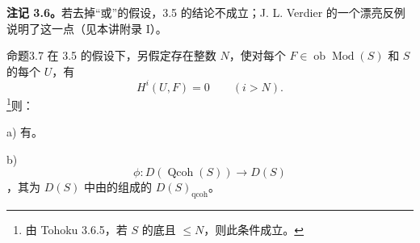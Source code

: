 \textbf{注记 3.6。}若去掉“或”的假设，3.5 的结论不成立；J. L. Verdier 的一个漂亮反例说明了这一点（见本讲附录 I）。
\begin{SGAresult}{命题}{3.7}
在 3.5 的假设下，另假定存在整数 $N$，使对每个 $F\in\operatorname{ob}\operatorname{Mod}(S)$ 和 $S$ 的每个 $U$，有
\[
H^i(U,F)=0\qquad(i>N).
\]
\footnote{由 Tohoku 3.6.5，若 $S$ 的底且  $\leq N$，则此条件成立。}则：

a) 有。

b) 
\[
\phi:D(\operatorname{Qcoh}(S))\longrightarrow D(S)
\]
，其为 $D(S)$ 中由的组成的 $D(S)_{\mathrm{qcoh}}$。
\end{SGAresult}
